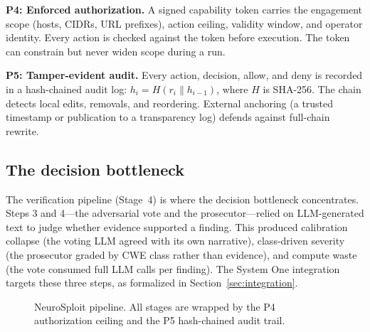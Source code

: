 \documentclass[conference]{IEEEtran}
\begin{document}
\textbf{P4: Enforced authorization.} A signed capability token carries the engagement scope (hosts, CIDRs, URL prefixes), action ceiling, validity window, and operator identity. Every action is checked against the token before execution. The token can constrain but never widen scope during a run.

\textbf{P5: Tamper-evident audit.} Every action, decision, allow, and deny is recorded in a hash-chained audit log: $h_i = H(r_i \| h_{i-1})$, where $H$ is SHA-256. The chain detects local edits, removals, and reordering. External anchoring (a trusted timestamp or publication to a transparency log) defends against full-chain rewrite.

\subsection{The decision bottleneck}

The verification pipeline (Stage~4) is where the decision bottleneck concentrates. Steps 3 and 4---the adversarial vote and the prosecutor---relied on LLM-generated text to judge whether evidence supported a finding. This produced calibration collapse (the voting LLM agreed with its own narrative), class-driven severity (the prosecutor graded by CWE class rather than evidence), and compute waste (the vote consumed full LLM calls per finding). The System One integration targets these three steps, as formalized in Section~\ref{sec:integration}.

\begin{figure}[t]
\centering
{}
\caption{NeuroSploit pipeline. All stages are wrapped by the P4 authorization ceiling and the P5 hash-chained audit trail.}
\label{fig:arch}
\end{figure}
\end{document}
